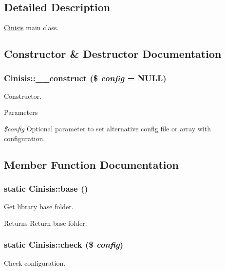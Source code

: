\subsection{Detailed Description}
\hyperlink{classCinisis}{Cinisis} main class. 

\subsection{Constructor \& Destructor Documentation}
\hypertarget{classCinisis_ab9cb7a94d6a5dfb13d50e83e58a4cc10}{
\subsubsection[{\_\-\_\-construct}]{\setlength{\rightskip}{0pt plus 5cm}Cinisis::\_\-\_\-construct (\$ {\em config} = {\ttfamily NULL})}}
\label{classCinisis_ab9cb7a94d6a5dfb13d50e83e58a4cc10}
Constructor.


\begin{DoxyParams}{Parameters}
\item[{\em \$config}]Optional parameter to set alternative config file or array with configuration. \end{DoxyParams}


\subsection{Member Function Documentation}
\hypertarget{classCinisis_a125ecd4426e15e2c27daa16d4aaac3f2}{
\subsubsection[{base}]{\setlength{\rightskip}{0pt plus 5cm}static Cinisis::base ()}}
\label{classCinisis_a125ecd4426e15e2c27daa16d4aaac3f2}
Get library base folder.

\begin{DoxyReturn}{Returns}
Return base folder. 
\end{DoxyReturn}
\hypertarget{classCinisis_ae6f679192f136ba61e85130ccab8e7ef}{
\subsubsection[{check}]{\setlength{\rightskip}{0pt plus 5cm}static Cinisis::check (\$ {\em config})}}
\label{classCinisis_ae6f679192f136ba61e85130ccab8e7ef}
Check configuration.



